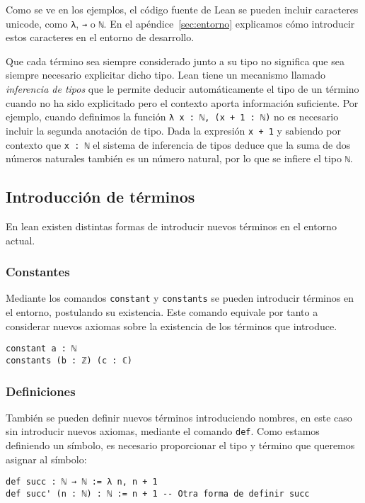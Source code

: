 Como se ve en los ejemplos, el código fuente de Lean se pueden incluir
caracteres unicode, como \lstinline{λ}, \lstinline{→} o \lstinline{ℕ}.
En el apéndice~\ref{sec:entorno} explicamos cómo introducir estos caracteres
en el entorno de desarrollo.

Que cada término sea siempre considerado junto a su tipo no significa que sea
siempre necesario explicitar dicho tipo. Lean tiene un mecanismo llamado
\textit{inferencia de tipos} que le permite deducir automáticamente el tipo de
un término cuando no ha sido explicitado pero el contexto aporta información
suficiente.
Por ejemplo, cuando definimos la función \lstinline{λ x : ℕ, (x + 1 : ℕ)} no es
necesario incluir la segunda anotación de tipo. Dada la expresión
\lstinline{x + 1} y sabiendo por contexto que \lstinline{x : ℕ} el sistema de
inferencia de tipos deduce que la suma de dos números naturales también es un
número natural, por lo que se infiere el tipo \lstinline{ℕ}.

\subsection{Introducci\'{o}n de t\'{e}rminos}

En lean existen distintas formas de introducir nuevos términos en el entorno
actual.

\subsubsection*{Constantes}%

Mediante los comandos \lstinline{constant} y \lstinline{constants} se
pueden introducir términos en el entorno, postulando su existencia. Este comando
equivale por tanto a considerar nuevos axiomas sobre la existencia de los
términos que introduce.
\begin{lstlisting}
constant a : ℕ
constants (b : ℤ) (c : ℂ)
\end{lstlisting}


\subsubsection*{Definiciones}%

También se pueden definir nuevos términos introduciendo nombres, en este caso
sin introducir nuevos axiomas, mediante el comando \lstinline{def}. Como estamos
definiendo un símbolo, es necesario proporcionar el tipo y término que queremos
asignar al símbolo:

\begin{lstlisting}
def succ : ℕ → ℕ := λ n, n + 1
def succ' (n : ℕ) : ℕ := n + 1 -- Otra forma de definir succ
\end{lstlisting}

